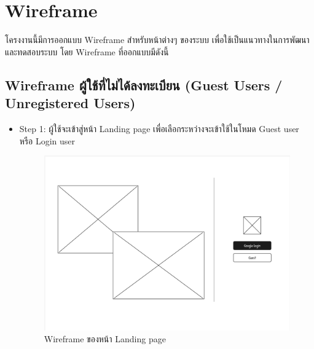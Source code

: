 \section{Wireframe}
\begin{mypara}
    \indent โครงงานนี้มีการออกแบบ Wireframe สำหรับหน้าต่างๆ ของระบบ 
    เพื่อใช้เป็นแนวทางในการพัฒนาและทดสอบระบบ โดย Wireframe ที่ออกแบบมีดังนี้

\subsection{Wireframe ผู้ใช้ที่ไม่ได้ลงทะเบียน (Guest Users / Unregistered Users)}
\begin{itemize}
    \item Step 1: ผู้ใช้จะเข้าสู่หน้า Landing page เพื่อเลือกระหว่างจะเข้าใช้ในโหมด Guest user หรือ Login user
      \begin{figure}[H]
        \centering
        \includegraphics[scale=0.35]
        {homepage.png}
        \caption{Wireframe ของหน้า Landing page}
        \label{fig:WireframeHomepage}
      \end{figure}


\end{itemize}
\end{mypara}

